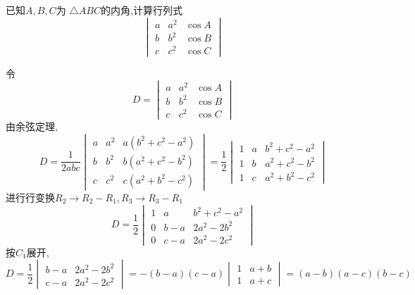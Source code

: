 \begin{questions}
    \question 已知$A,B,C$为 $\triangle ABC$的内角,计算行列式
    \[
    \begin{vmatrix} 
    a & a^2 & \cos A \\ 
    b & b^2 & \cos B \\ 
    c & c^2 & \cos C 
    \end{vmatrix}
    \]
    \begin{solution}
        令
        \[
        D=\begin{vmatrix} 
        a & a^2 & \cos A \\ 
        b & b^2 & \cos B \\ 
        c & c^2 & \cos C 
        \end{vmatrix}
        \]
        由余弦定理,
        \[
        D= \frac{1}{2abc} 
        \begin{vmatrix} 
        a & a^2 & a(b^2+c^2-a^2) \\ 
        b & b^2 & b(a^2+c^2-b^2) \\ 
        c & c^2 & c(a^2+b^2-c^2) 
        \end{vmatrix}
        = \frac{1}{2} 
        \begin{vmatrix} 
        1 & a & b^2+c^2-a^2 \\ 
        1 & b & a^2+c^2-b^2 \\ 
        1 & c & a^2+b^2-c^2 
        \end{vmatrix}
        \]
        进行行变换$R_2 \to R_2-R_1, R_3 \to R_3-R_1$
        \[
        D=\frac{1}{2} 
        \begin{vmatrix} 
        1 & a & b^2+c^2-a^2 \\ 
        0 & b-a & 2a^2-2b^2 \\ 
        0 & c-a & 2a^2-2c^2 
        \end{vmatrix}
        \]
        按$C_1$展开,
        \[
        D= \frac{1}{2} 
        \begin{vmatrix} 
        b-a & 2a^2-2b^2 \\ 
        c-a & 2a^2-2c^2 
        \end{vmatrix}
        = -(b-a)(c-a) 
        \begin{vmatrix} 
        1 & a+b \\ 
        1 & a+c 
        \end{vmatrix}
        = (a-b)(a-c)(b-c)
        \]
    \end{solution}


\end{questions}
